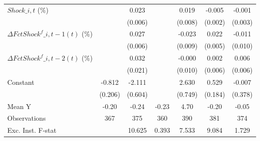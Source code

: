 {\begin{tabular}{l*{6}{c}}
\addlinespace
$ Shock\_{i,t}$ (\%) &                     &       0.023\sym{***}&                     &       0.019\sym{**} &      -0.005\sym{***}&      -0.001         \\
                    &                     &     (0.006)         &                     &     (0.008)         &     (0.002)         &     (0.003)         \\
\addlinespace
$ \Delta FctShock^f\_{i,t-1}(t)$ (\%)&                     &       0.027\sym{***}&                     &      -0.023\sym{**} &       0.022\sym{***}&      -0.011         \\
                    &                     &     (0.006)         &                     &     (0.009)         &     (0.005)         &     (0.010)         \\
\addlinespace
$ \Delta FctShock^f\_{i,t-2}(t)$ (\%)&                     &       0.032         &                     &      -0.000         &       0.002         &       0.006         \\
                    &                     &     (0.021)         &                     &     (0.010)         &     (0.006)         &     (0.006)         \\
\addlinespace
Constant            &      -0.812\sym{***}&      -2.111\sym{***}&                     &       2.630\sym{***}&       0.529\sym{***}&      -0.007         \\
                    &     (0.206)         &     (0.604)         &                     &     (0.749)         &     (0.184)         &     (0.378)         \\
\midrule
Mean Y              &       -0.20         &       -0.24         &       -0.23         &        4.70         &       -0.20         &       -0.05         \\
Observations        &         367         &         375         &         360         &         390         &         381         &         374         \\
Exc. Inst. F-stat   &                     &      10.625         &       0.393         &       7.533         &       9.084         &       1.729         \\
\bottomrule
\end{tabular}
}
